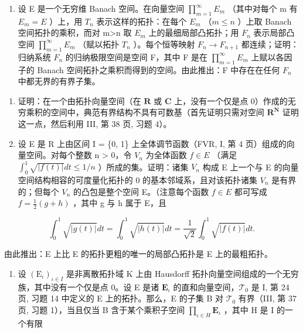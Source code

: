 \begin{enumerate}
\def\labelenumi{\alph{enumi})}
\setcounter{enumi}{1}
\tightlist
\item
  设 E 是一个无穷维 Banach 空间。在向量空间 \(\prod_{m=1}^{\infty}E_{m}\) （其中对每个 m 有 \(E_{m}=E\) ）上，用 \(T_{n}\) 表示这样的拓扑：在每个 \(E_{m}\) （\(m\leqslant n\) ）上取 Banach 空间拓扑的乘积，而对 m\textgreater n 取 \(E_{m}\) 上的最细局部凸拓扑；用 \(F_{n}\) 表示局部凸空间 \(\prod_{m=1}^{\infty}E_{m}\) （赋以拓扑 \(T_{n}\) ）。每个恒等映射 \(F_{n}\to F_{n+1}\) 都连续；证明：归纳系统 \(F_{n}\) 的归纳极限空间是空间 F，其中 F 是在 \(\prod_{m=1}^{\infty}E_{m}\) 上赋以各因子的 Banach 空间拓扑之乘积而得到的空间。由此推出：F 中存在在任何 \(F_{n}\) 中都无界的有界子集。
\end{enumerate}

\begin{enumerate}
\def\labelenumi{\arabic{enumi})}
\setcounter{enumi}{7}
\item
  证明：在一个由拓扑向量空间（在 \(\mathbf{R}\) 或 \(\mathbf{C}\) 上，没有一个仅是点 0）作成的无穷乘积的空间中，典范有界结构不具有可数基（首先证明只需对空间 \(\mathbf{R}^{\mathbf{N}}\) 证明这一点，然后利用 III, 第 38 页, 习题 4）。
\item
  设 E 是 R 上由区间 I = \{0, 1\} 上全体调节函数（FVR, I, 第 4 页）组成的向量空间。对每个整数 n \textgreater{} 0，令 \(V_{n}\) 为全体函数 \(f \in E\) （满足 \(\int_{0}^{1} \sqrt{|f(t)|} dt \leqslant 1/n\) ）所成的集。证明：诸集 \(V_{n}\) 构成 E 上一个与 E 的向量空间结构相容的可度量化拓扑的 0 的基本邻域系，且对该拓扑诸集 \(V_{n}\) 是有界的；但每个 \(V_{n}\) 的凸包是整个空间 E。（注意每个函数 \(f \in E\) 都可写成 \(f = \frac{1}{2}(g + h)\) ，其中 g 与 h 属于 E，且
\end{enumerate}

\[
\int_ {0} ^ {1} \sqrt {| g (t) |} d t = \int_ {0} ^ {1} \sqrt {| h (t) |} d t = \frac {1}{\sqrt {2}} \int_ {0} ^ {1} \sqrt {| f (t) |} d t.
\]

由此推出：E 上比 E 的拓扑更粗的唯一的局部凸拓扑是 E 上的最粗拓扑。

\begin{enumerate}
\def\labelenumi{\arabic{enumi})}
\setcounter{enumi}{9}
\tightlist
\item
  设 \((\mathrm{E}_{\iota})_{\iota \in I}\) 是非离散拓扑域 K 上由 Hausdorff 拓扑向量空间组成的一个无穷族，其中没有一个仅是点 0。设 E 是诸 \(\mathbf{E}_{\iota}\) 的直和向量空间，\(\mathcal{T}_0\) 是 I, 第 24 页, 习题 14 中定义的 E 上的拓扑。那么，E 的子集 B 对 \(\mathcal{T}_0\) 有界（III, 第 37 页, 习题 1），当且仅当 B 含于某个乘积子空间 \(\prod_{\iota \in H} \mathbf{E}_{\iota}\) ，其中 H 是 I 的一个有限
\end{enumerate}


